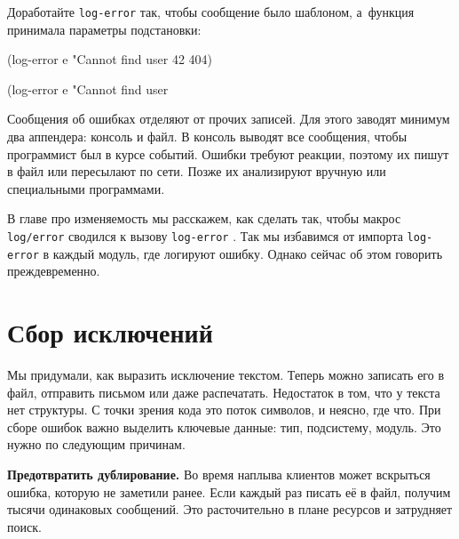 \fi

Доработайте \verb|log-error| так, чтобы сообщение было шаблоном, а~функция
принимала параметры подстановки:

\ifx\devicetype\mobile

\begin{english}
  \begin{clojure}
(log-error e
  "Cannot find user %
  42 404)
  \end{clojure}
\end{english}

\else

\begin{english}
  \begin{clojure}
(log-error e "Cannot find user %
  \end{clojure}
\end{english}

\fi

Сообщения об ошибках отделяют от прочих записей. Для этого заводят минимум два
аппендера: консоль и файл. В консоль выводят все сообщения, чтобы программист
был в курсе событий. Ошибки требуют реакции, поэтому их пишут в файл или
пересылают по сети. Позже их анализируют вручную или специальными программами.

В главе про изменяемость мы расскажем, как сделать так, чтобы макрос
\verb|log/error| сводился к вызову \verb|log-error| .
Так мы избавимся от импорта \verb|log-error| в каждый модуль, где логируют ошибку.
Однако сейчас об этом говорить преждевременно.

\section{Сбор исключений}


Мы придумали, как выразить исключение текстом. Теперь можно записать его в файл,
отправить письмом или даже распечатать. Недостаток в том, что у текста нет
структуры. С точки зрения кода это поток символов, и неясно, где что. При сборе
ошибок важно выделить ключевые данные: тип, подсистему, модуль. Это нужно по
следующим причинам.

\textbf{Предотвратить дублирование.} Во время наплыва клиентов может вскрыться
ошибка, которую не заметили ранее. Если каждый раз писать её в файл, получим
тысячи одинаковых сообщений. Это расточительно в плане ресурсов и затрудняет
поиск.

